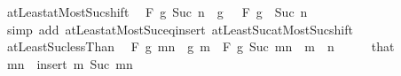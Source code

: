 \begin{isabellebody}
\endisatagproof
{\isafoldproof}%
%
\isadelimproof
\isanewline
%
\endisadelimproof
\isanewline
{}\isamarkupfalse%
\ atLeast{}{\isacharunderscore}{\kern0pt}atMost{\isacharunderscore}{\kern0pt}Suc{\isacharunderscore}{\kern0pt}shift{\isacharcolon}{\kern0pt}\isanewline
\ \ {\isachardoublequoteopen}F\ g\ {\isacharbraceleft}{\kern0pt}{}{\isachardot}{\kern0pt}{\isachardot}{\kern0pt}Suc\ n{\isacharbraceright}{\kern0pt}\ {\isacharequal}{\kern0pt}\ g\ {}\ \isactrlbold {\isacharasterisk}{\kern0pt}\ F\ {\isacharparenleft}{\kern0pt}g\ {\isasymcirc}\ Suc{\isacharparenright}{\kern0pt}\ {\isacharbraceleft}{\kern0pt}{}{\isachardot}{\kern0pt}{\isachardot}{\kern0pt}n{\isacharbraceright}{\kern0pt}{\isachardoublequoteclose}\isanewline
%
\isadelimproof
\ \ %
\endisadelimproof
%
\isatagproof
{}\isamarkupfalse%
\ {\isacharparenleft}{\kern0pt}simp\ add{\isacharcolon}{\kern0pt}\ atLeast{}{\isacharunderscore}{\kern0pt}atMost{\isacharunderscore}{\kern0pt}Suc{\isacharunderscore}{\kern0pt}eq{\isacharunderscore}{\kern0pt}insert{\isacharunderscore}{\kern0pt}{}\ atLeast{\isacharunderscore}{\kern0pt}Suc{\isacharunderscore}{\kern0pt}atMost{\isacharunderscore}{\kern0pt}Suc{\isacharunderscore}{\kern0pt}shift{\isacharparenright}{\kern0pt}%
\endisatagproof
{\isafoldproof}%
%
\isadelimproof
\isanewline
%
\endisadelimproof
\isanewline
{}\isamarkupfalse%
\ atLeast{\isacharunderscore}{\kern0pt}Suc{\isacharunderscore}{\kern0pt}lessThan{\isacharcolon}{\kern0pt}\isanewline
\ \ {\isachardoublequoteopen}F\ g\ {\isacharbraceleft}{\kern0pt}m{\isachardot}{\kern0pt}{\isachardot}{\kern0pt}{\isacharless}{\kern0pt}n{\isacharbraceright}{\kern0pt}\ {\isacharequal}{\kern0pt}\ g\ m\ \isactrlbold {\isacharasterisk}{\kern0pt}\ F\ g\ {\isacharbraceleft}{\kern0pt}Suc\ m{\isachardot}{\kern0pt}{\isachardot}{\kern0pt}{\isacharless}{\kern0pt}n{\isacharbraceright}{\kern0pt}{\isachardoublequoteclose}\ \ {\isachardoublequoteopen}m\ {\isacharless}{\kern0pt}\ n{\isachardoublequoteclose}\isanewline
%
\isadelimproof
%
\endisadelimproof
%
\isatagproof
{}\isamarkupfalse%
\ {\isacharminus}{\kern0pt}\isanewline
\ \ \isamarkupfalse%
\ that\ \isamarkupfalse%
\ {\isachardoublequoteopen}{\isacharbraceleft}{\kern0pt}m{\isachardot}{\kern0pt}{\isachardot}{\kern0pt}{\isacharless}{\kern0pt}n{\isacharbraceright}{\kern0pt}\ {\isacharequal}{\kern0pt}\ insert\ m\ {\isacharbraceleft}{\kern0pt}Suc\ m{\isachardot}{\kern0pt}{\isachardot}{\kern0pt}{\isacharless}{\kern0pt}n{\isacharbraceright}{\kern0pt}{\isachardoublequoteclose}\isanewline

\end{isabellebody}
